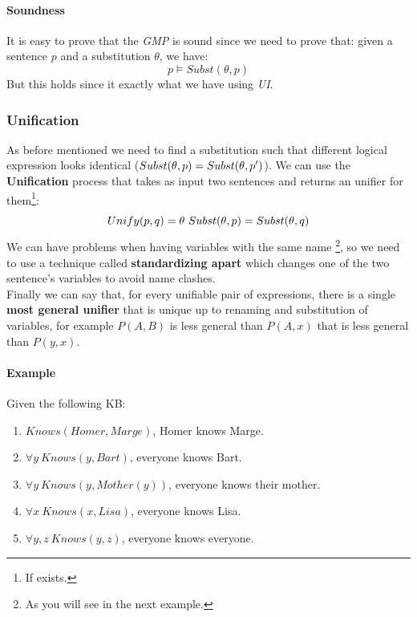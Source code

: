 \documentclass[10pt,a4paper]{article}
\begin{document}
\paragraph{Soundness}
It is easy to prove that the \textit{GMP} is sound since we need to prove that: given a sentence $p$ and a substitution $\theta$, we have:
\[p \models Subst(\theta,p)\] 
But this holds since it exactly what we have using \textit{UI}.

\subsubsection{Unification}
As before mentioned we need to find a substitution such that different logical expression looks identical ($Subst(\theta,p)=Subst(\theta,p')$). We can use the \textbf{Unification} process that takes as input two sentences and returns an unifier for them\footnote{If exists.}:
\[Unify(p,q)=\theta\ Subst(\theta,p)=Subst(\theta,q)\]
We can have problems when having variables with the same name \footnote{As you will see in the next example.}, so we need to use a technique called \textbf{standardizing apart} which changes one of the two sentence's variables to avoid name clashes.\\
Finally we can say that, for every unifiable pair of expressions, there is a single \textbf{most general unifier} that is unique up to renaming and substitution of variables, for example $P(A,B)$ is less general than $P(A,x)$ that is less general than $P(y,x)$. 

\paragraph{Example}
Given the following KB:
\begin{enumerate}
\item $Knows(Homer, Marge)$, Homer knows Marge.
\item $\forall y\ Knows(y,Bart)$, everyone knows Bart.
\item $\forall y\ Knows(y,Mother(y))$, everyone knows their mother.
\item $\forall x\ Knows(x,Lisa)$, everyone knows Lisa.
\item $\forall y,z\ Knows(y,z)$, everyone knows everyone.
\end{enumerate}
\end{document}

